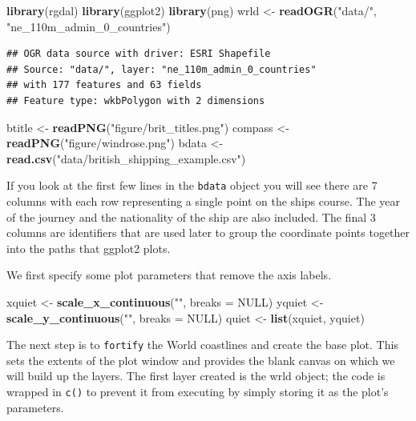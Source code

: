 \documentclass[]{article}
\newenvironment{Shaded}{}{}
\newcommand{\KeywordTok}[1]{\textcolor[rgb]{0.00,0.44,0.13}{\textbf{{#1}}}}
\newcommand{\DataTypeTok}[1]{\textcolor[rgb]{0.56,0.13,0.00}{{#1}}}
\newcommand{\StringTok}[1]{\textcolor[rgb]{0.25,0.44,0.63}{{#1}}}
\newcommand{\OtherTok}[1]{\textcolor[rgb]{0.00,0.44,0.13}{{#1}}}
\newcommand{\NormalTok}[1]{{#1}}
\begin{document}
\begin{Shaded}
\begin{Highlighting}[]
\KeywordTok{library}\NormalTok{(rgdal)}
\KeywordTok{library}\NormalTok{(ggplot2)}
\KeywordTok{library}\NormalTok{(png)}
\NormalTok{wrld <- }\KeywordTok{readOGR}\NormalTok{(}\StringTok{"data/"}\NormalTok{, }\StringTok{"ne_110m_admin_0_countries"}\NormalTok{)}
\end{Highlighting}
\end{Shaded}
\begin{verbatim}
## OGR data source with driver: ESRI Shapefile 
## Source: "data/", layer: "ne_110m_admin_0_countries"
## with 177 features and 63 fields
## Feature type: wkbPolygon with 2 dimensions
\end{verbatim}
\begin{Shaded}
\begin{Highlighting}[]
\NormalTok{btitle <- }\KeywordTok{readPNG}\NormalTok{(}\StringTok{"figure/brit_titles.png"}\NormalTok{)}
\NormalTok{compass <- }\KeywordTok{readPNG}\NormalTok{(}\StringTok{"figure/windrose.png"}\NormalTok{)}
\NormalTok{bdata <- }\KeywordTok{read.csv}\NormalTok{(}\StringTok{"data/british_shipping_example.csv"}\NormalTok{)}
\end{Highlighting}
\end{Shaded}
If you look at the first few lines in the \texttt{bdata} object you will
see there are 7 columns with each row representing a single point on the
ships course. The year of the journey and the nationality of the ship
are also included. The final 3 columns are identifiers that are used
later to group the coordinate points together into the paths that
ggplot2 plots.

We first specify some plot parameters that remove the axis labels.

\begin{Shaded}
\begin{Highlighting}[]
\NormalTok{xquiet <- }\KeywordTok{scale_x_continuous}\NormalTok{(}\StringTok{""}\NormalTok{, }\DataTypeTok{breaks =} \OtherTok{NULL}\NormalTok{)}
\NormalTok{yquiet <- }\KeywordTok{scale_y_continuous}\NormalTok{(}\StringTok{""}\NormalTok{, }\DataTypeTok{breaks =} \OtherTok{NULL}\NormalTok{)}
\NormalTok{quiet <- }\KeywordTok{list}\NormalTok{(xquiet, yquiet)}
\end{Highlighting}
\end{Shaded}
The next step is to \texttt{fortify} the World coastlines and create the
base plot. This sets the extents of the plot window and provides the
blank canvas on which we will build up the layers. The first layer
created is the wrld object; the code is wrapped in \texttt{c()} to
prevent it from executing by simply storing it as the plot's parameters.
\end{document}
